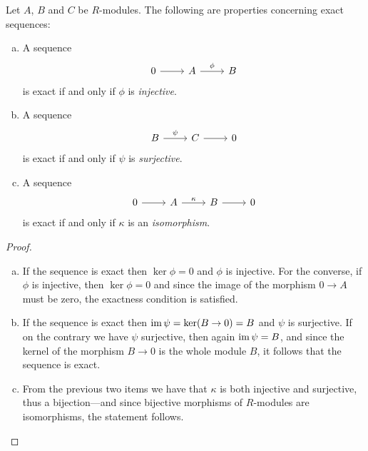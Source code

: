 \begin{proposition}
    \label{prop:exact-sequence-properties-zero-maps}
    Let \(A\), \(B\) and \(C\) be \(R\)-modules. The following are properties
    concerning exact sequences:
    \begin{enumerate}[(a)]\setlength\itemsep{0em}
        \item A sequence
              \[
                  \begin{tikzcd}
                      0 \ar[r] &A \ar[r, "\phi"] &B
                  \end{tikzcd}
              \]
              is exact if and only if \(\phi\) is \emph{injective}.
        \item A sequence
              \[
                  \begin{tikzcd}
                      B \ar[r, "\psi"] & C \ar[r] &0
                  \end{tikzcd}
              \]
              is exact if and only if \(\psi\) is \emph{surjective}.
        \item A sequence
              \[
                  \begin{tikzcd}
                      0 \ar[r] &A \ar[r, "\kappa"] &B \ar[r] &0
                  \end{tikzcd}
              \]
              is exact if and only if \(\kappa\) is an \emph{isomorphism}.
    \end{enumerate}
\end{proposition}

\begin{proof}
    \begin{enumerate}[(a)]\setlength\itemsep{0em}
        \item If the sequence is exact then \(\ker \phi = 0\) and \(\phi\) is
              injective. For the converse, if \(\phi\) is injective, then \(\ker \phi = 0\)
              and since the image of the morphism \(0 \to A\) must be zero, the exactness
              condition is satisfied.
        \item If the sequence is exact then \(\operatorname{im} \psi = \ker(B \to 0) = B\) and
              \(\psi\) is surjective. If on the contrary we have \(\psi\) surjective, then
              again \(\operatorname{im} \psi = B\), and since the kernel of the morphism \(B \to 0\) is
              the whole module \(B\), it follows that the sequence is exact.
        \item From the previous two items we have that \(\kappa\) is both injective and
              surjective, thus a bijection---and since bijective morphisms of \(R\)-modules
              are isomorphisms, the statement follows.
    \end{enumerate}
\end{proof}

